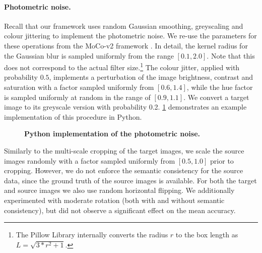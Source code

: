 
\paragraph{Photometric noise.}
Recall that our framework uses random Gaussian smoothing, greyscaling and colour jittering to implement the photometric noise.
We re-use the parameters for these operations from the MoCo-v2 framework .
In detail, the kernel radius for the Gaussian blur is sampled uniformly from the range $[0.1, 2.0]$.
Note that this does not correspond to the actual filter size.\footnote{The Pillow Library  internally converts the radius $r$ to the box length as $L = \sqrt{3 * r^2 + 1}$.}
The colour jitter, applied with probability $0.5$, implements a perturbation of the image brightness, contrast and saturation with a factor sampled uniformly from $[0.6, 1.4]$, while the hue factor is sampled uniformly at random in the range of $[0.9, 1.1]$.
We convert a target image to its greyscale version with probability \num{0.2}.
\cref{fig:photometric} demonstrates an example implementation of this procedure in Python.

\begin{figure}[t]

\vspace{-0.5em}
\caption{\textbf{Python implementation of the photometric noise.}}
\label{fig:photometric}
\vspace{-0.5em}
\end{figure}

Similarly to the multi-scale cropping of the target images, we scale the source images randomly with a factor sampled uniformly from $[0.5, 1.0]$ prior to cropping.
However, we do not enforce the semantic consistency for the source data, since the ground truth of the source images is available.
For both the target and source images we also use random horizontal flipping.
We additionally experimented with moderate rotation (both with and without semantic consistency), but did not observe a significant effect on the mean accuracy.

